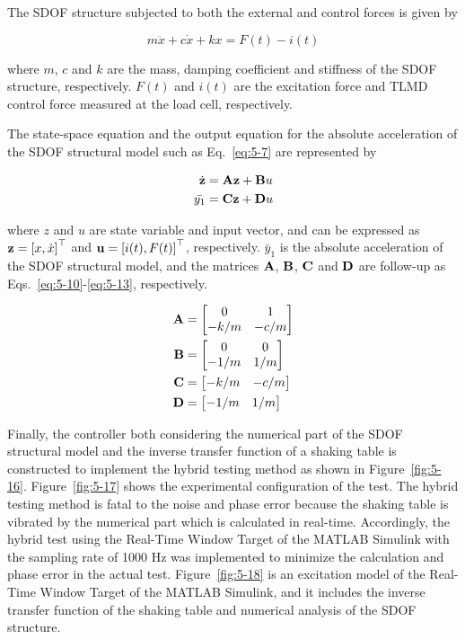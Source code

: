 The SDOF structure subjected to both the external and control forces is given by

\begin{equation}\label{eq:5-7}
m\ddot{x}+c\dot{x}+kx = F(t) - i(t)
\end{equation}

where $m$, $c$ and $k$ are the mass, damping coefficient and stiffness of the SDOF structure, respectively. $F(t)$ and $i(t)$ are the excitation force and TLMD control force measured at the load cell, respectively.

The state-space equation and the output equation for the absolute acceleration of the SDOF structural model such as Eq.~\eqref{eq:5-7} are represented by

\begin{align}
\dot{\mathbf{z}}&=\mathbf{A}\mathbf{z}+\mathbf{B}u \label{eq:5-8} \\
\bar{y_{1}}&=\mathbf{C}\mathbf{z} + \mathbf{D}u \label{eq:5-9}
\end{align}

where $z$ and $u$ are state variable and input vector, and can be expressed as $\mathbf{z}=\left[x, \dot{x}\right]^{\top}$ and $\mathbf{u} = \left[i(t), F(t)\right]^{\top}$, respectively. $\bar{y}_{1}$ is the absolute acceleration of the SDOF structural model, and the matrices $\mathbf{A}$, $\mathbf{B}$, $\mathbf{C}$ and $\mathbf{D}$ are follow-up as Eqs.~\eqref{eq:5-10}-\eqref{eq:5-13}, respectively.

\begin{align}
\mathbf{A}&=\begin{bmatrix} 0 & 1 \\ -k/m & -c/m \end{bmatrix} \label{eq:5-10} \\
\mathbf{B}&=\begin{bmatrix} 0 & 0 \\ -1/m & 1/m \end{bmatrix} \label{eq:5-11} \\
\mathbf{C}&=\begin{bmatrix} -k/m & -c/m \end{bmatrix} \label{eq:5-12} \\
\mathbf{D}&=\begin{bmatrix} -1/m & 1/m \end{bmatrix} \label{eq:5-13}
\end{align}

Finally, the controller both considering the numerical part of the SDOF structural model and the inverse transfer function of a shaking table is constructed to implement the hybrid testing method as shown in Figure~\ref{fig:5-16}. Figure~\ref{fig:5-17} shows the experimental configuration of the test. The hybrid testing method is fatal to the noise and phase error because the shaking table is vibrated by the numerical part which is calculated in real-time. Accordingly, the hybrid test using the Real-Time Window Target of the MATLAB Simulink with the sampling rate of 1000 Hz was implemented to minimize the calculation and phase error in the actual test. Figure~\ref{fig:5-18} is an excitation model of the Real-Time Window Target of the MATLAB Simulink, and it includes the inverse transfer function of the shaking table and numerical analysis of the SDOF structure.

